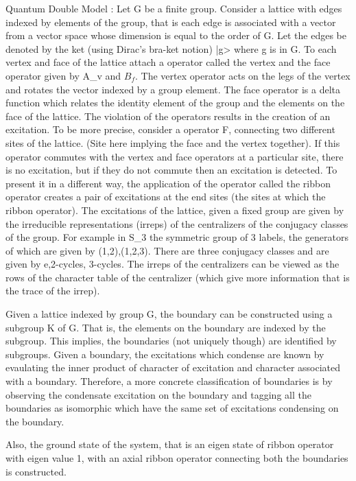 \documentclass[a4paper,10pt]{article}
\begin{document}
Quantum Double Model : Let G be a finite group. Consider a lattice with edges indexed by elements of the group, that is each edge is associated with a vector from a vector space whose dimension
is equal to the order of G. Let the edges be denoted by the ket (using Dirac's bra-ket notion) |g> where g is in G. To each vertex and face of the lattice attach a operator called the vertex and
the face operator given by A_{v} and  $B_{f}$. The vertex operator acts on the legs of the vertex and rotates the vector indexed by a group element. The face operator is a delta function which
relates the identity element of the group and the elements on the face of the lattice. The violation of the operators results in the creation of an excitation. To be more precise, consider a 
operator F, connecting two different sites of the lattice. (Site here implying the face and the vertex together). If this operator commutes with the vertex and face operators at a 
particular site, there is no excitation, but if they do not commute then an excitation is detected. To present it in a different way, the application of the operator called the ribbon operator
creates a pair of excitations at the end sites (the sites at which the ribbon operator). The excitations of the lattice, given a fixed group are given by the irreducible representations (irreps) of the
centralizers of the conjugacy classes of the group. For example in S_{3} the symmetric group of 3 labels, the generators of which are given by {(1,2),(1,2,3)}. There are three conjugacy classes
and are given by {e},2-cycles, 3-cycles. The irreps of the centralizers can be viewed as the rows of the character table of the centralizer (which give more information that is the
trace of the irrep). 

Given a lattice indexed by group G, the boundary can be constructed using a subgroup K of G. That is, the elements on the boundary are indexed by the subgroup. This implies, the boundaries
(not uniquely though) are identified by subgroups. Given a boundary, the excitations which condense are known by evaulating the inner product of character of excitation and character associated
with a boundary. Therefore, a more concrete classification  of boundaries is by observing the condensate excitation on the boundary and tagging all the boundaries as isomorphic which have the same
set of excitations condensing on the boundary. 

Also, the ground state of the system, that is an eigen state of ribbon operator with eigen value 1, with an axial ribbon operator connecting both the boundaries is constructed.
\end{document}
